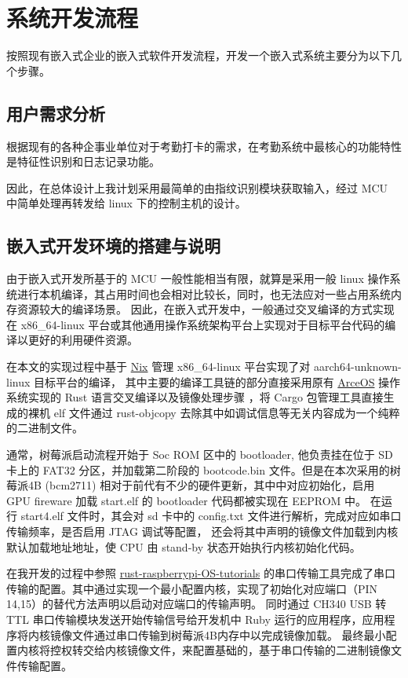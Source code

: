 \section{系统开发流程}

    按照现有嵌入式企业的嵌入式软件开发流程，开发一个嵌入式系统主要分为以下几个步骤。

\subsection{用户需求分析}

    根据现有的各种企事业单位对于考勤打卡的需求，在考勤系统中最核心的功能特性是特征性识别和日志记录功能。
    
    因此，在总体设计上我计划采用最简单的由指纹识别模块获取输入，经过 MCU 中简单处理再转发给
    linux 下的控制主机的设计。

\subsection{嵌入式开发环境的搭建与说明}

    由于嵌入式开发所基于的 MCU 一般性能相当有限，就算是采用一般 linux 操作系统进行本机编译，其占用时间也会相对比较长，同时，也无法应对一些占用系统内存资源较大的编译场景。
    因此，在嵌入式开发中，一般通过交叉编译的方式实现在 x86\_64-linux 平台或其他通用操作系统架构平台上实现对于目标平台代码的编译以更好的利用硬件资源。

    在本文的实现过程中基于 \href{https://nixos.org/}{Nix} 管理 x86\_64-linux 平台实现了对 aarch64-unknown-linux 目标平台的编译，
    其中主要的编译工具链的部分直接采用原有 \href{https://github.com/rcore-os/arceos}{ArceOS} 操作系统实现的 Rust 语言交叉编译以及镜像处理步骤
    ，将 Cargo 包管理工具直接生成的裸机 elf 文件通过 rust-objcopy 去除其中如调试信息等无关内容成为一个纯粹的二进制文件。 
  
    通常，树莓派启动流程开始于 Soc ROM 区中的 bootloader, 他负责挂在位于 SD 卡上的 FAT32 分区，并加载第二阶段的 bootcode.bin 文件。但是在本次采用的树莓派4B (bcm2711) 
    相对于前代有不少的硬件更新，其中中对应初始化，启用 GPU fireware 加载 start.elf 的 bootloader 代码都被实现在 EEPROM 中。
    在运行 start4.elf 文件时，其会对 sd 卡中的 config.txt 文件进行解析，完成对应如串口传输频率，是否启用 JTAG 调试等配置，
    还会将其中声明的镜像文件加载到内核默认加载地址地址，使 CPU 由 stand-by 状态开始执行内核初始化代码。

    在我开发的过程中参照 \href{https://github.com/rust-embedded/rust-raspberrypi-OS-tutorials}{rust-raspberrypi-OS-tutorials} 
    的串口传输工具完成了串口传输的配置。其中通过实现一个最小配置内核，实现了初始化对应端口（PIN 14,15）的替代方法声明以启动对应端口的传输声明。
    同时通过 CH340 USB 转 TTL 串口传输模块发送开始传输信号给开发机中 Ruby 运行的应用程序，应用程序将内核镜像文件通过串口传输到树莓派4B内存中以完成镜像加载。
    最终最小配置内核将控权转交给内核镜像文件，来配置基础的，基于串口传输的二进制镜像文件传输配置。

